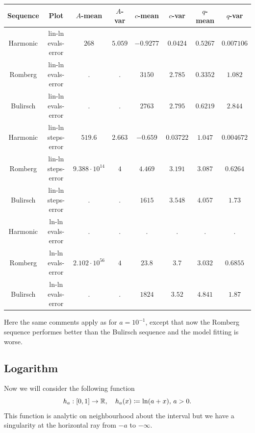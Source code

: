 \begin{table}[H]
    \centering
    \small
    \begin{tabular}{c|c||c|c|c|c|c	|c}
Sequence & Plot & \(A\)-mean & \(A\)-var & \(c\)-mean & \(c\)-var & \(q\)-mean & \(q\)-var\\\hline
Harmonic & lin-ln evals-error & \(268\) & \(5.059\) & \(-0.9277\) & \(0.0424\) & \(0.5267\) & \(0.007106\) \\
Romberg & lin-ln evals-error & \(.\) & \(.\) & \(3150\) & \(2.785\) & \(0.3352\) & \(1.082\) \\
Bulirsch & lin-ln evals-error & \(.\) & \(.\) & \(2763\) & \(2.795\) & \(0.6219\) & \(2.844\) \\
Harmonic & lin-ln steps-error & \(519.6\) & \(2.663\) & \(-0.659\) & \(0.03722\) & \(1.047\) & \(0.004672\) \\
Romberg & lin-ln steps-error & \(9.388\cdot 10^{14}\) & \(4\) & \(4.469\) & \(3.191\) & \(3.087\) & \(0.6264\) \\
Bulirsch & lin-ln steps-error & \(.\) & \(.\) & \(1615\) & \(3.548\) & \(4.057\) & \(1.73\) \\
Harmonic & ln-ln evals-error & . & . & . & . & . & . \\
Romberg & ln-ln evals-error & \(2.102\cdot 10^{56}\) & \(4\) & \(23.8\) & \(3.7\) & \(3.032\) & \(0.6855\) \\
Bulirsch & ln-ln evals-error & \(.\) & \(.\) & \(1824\) & \(3.52\) & \(4.841\) & \(1.87\) \\
    \end{tabular}
    \label{tab:my_label}
\end{table}

Here the same comments apply as for \(a = 10^{-1}\), except that now the Romberg sequence performes better than the Bulirsch sequence and the model fitting is worse.

\subsection{Logarithm}

Now we will consider the following function 
\[
h_a: [0, 1] \rightarrow \mathbb{R}, \quad h_a(x) \coloneqq \ln(a + x),\, a > 0.
\]
This function is analytic on neighbourhood about the interval but we have a singularity at the horizontal ray from \(-a\) to \(-\infty\).

